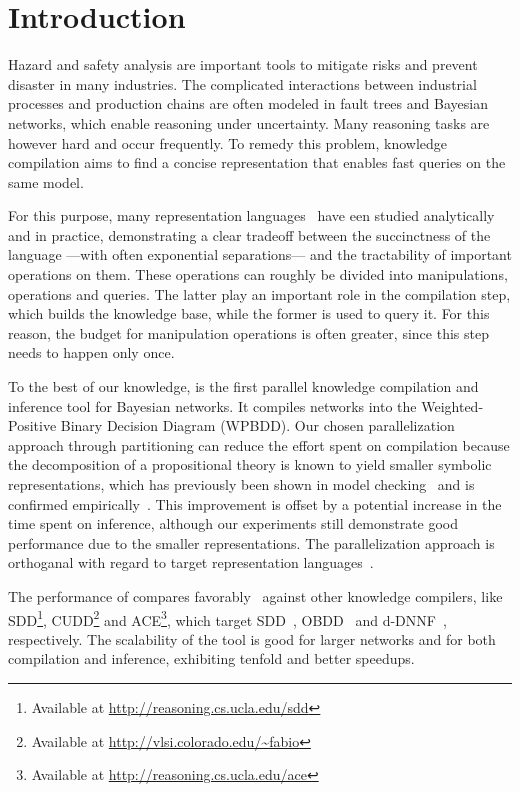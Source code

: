 
\section{Introduction}
\label{sec:introduction}

Hazard and safety analysis are important tools to mitigate risks and prevent disaster in many industries. The complicated interactions between industrial processes and production chains are often modeled in fault trees and Bayesian networks, which enable reasoning under uncertainty.
Many reasoning tasks are however hard and occur frequently. To remedy this problem, knowledge compilation aims to find a concise representation that enables fast queries on the same model.

For this purpose, many representation languages~\cite{darwiche2001decomposable,darwiche2002logical,darwiche2011sdd,darwiche2002knowledge,fargier2014knowledge,sanner2005affine,tafertshofer1997factored} have een studied analytically and in practice, demonstrating a clear tradeoff between the succinctness of the language ---with often exponential separations--- and the tractability of important operations on them. These operations can roughly be divided into manipulations, operations and queries. The latter play an important role in the compilation step, which builds the knowledge base, while the former is used to query it. For this reason, the budget for manipulation operations is often greater, since this step needs to happen only once.

To the best of our knowledge, \toolname is the first parallel knowledge compilation and inference tool for Bayesian networks. It compiles networks into the Weighted-Positive Binary Decision Diagram (WPBDD). Our chosen parallelization approach through partitioning can reduce the effort spent on compilation because the decomposition of a propositional theory is known to yield smaller symbolic representations, which has previously been shown in model checking~\cite{narayan1996partitioned,sahoo2004partitioning,grumberg2006work} and is confirmed empirically~\cite{dal2017reducing}.
 This improvement is offset by a potential increase in the time spent on inference, although our experiments still demonstrate good performance due to the smaller representations. The parallelization approach is orthoganal with regard to target representation languages~\cite{dal2018parallel}.

The performance of \toolname compares favorably~\cite{dal2018parallel} against other knowledge compilers, like SDD\footnote{Available at \url{http://reasoning.cs.ucla.edu/sdd}}, CUDD\footnote{Available at \url{http://vlsi.colorado.edu/~fabio}} and ACE\footnote{Available at \url{http://reasoning.cs.ucla.edu/ace}}, which target SDD~\cite{darwiche2011sdd}, OBDD~\cite{bryant1986graph} and d-DNNF~\cite{darwiche2002knowledge}, respectively. The scalability of the tool is good for larger networks and for both compilation and inference, exhibiting tenfold and better speedups.


